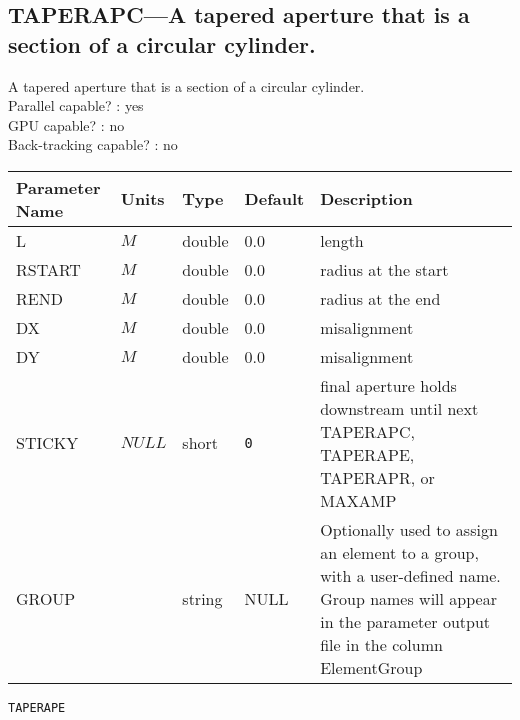 \subsection{TAPERAPC---A tapered aperture that is a section of a circular cylinder.}
A tapered aperture that is a section of a circular cylinder.
\\
Parallel capable? : yes\\
GPU capable? : no\\
Back-tracking capable? : no\\
\begin{tabular}{|l|l|l|l|p{\descwidth}|} \hline
Parameter Name & Units & Type & Default & Description \\ \hline 
L & $M$ & double &  0.0 & length  \\ \hline 
RSTART & $M$ & double &  0.0 & radius at the start  \\ \hline 
REND & $M$ & double &  0.0 & radius at the end  \\ \hline 
DX & $M$ & double &  0.0 & misalignment  \\ \hline 
DY & $M$ & double &  0.0 & misalignment  \\ \hline 
STICKY & $NULL$ & short &  \verb|0| & final aperture holds downstream until next TAPERAPC, TAPERAPE, TAPERAPR, or MAXAMP  \\ \hline 
GROUP &  & string & NULL & Optionally used to assign an element to a group, with a user-defined name.  Group names will appear in the parameter output file in the column ElementGroup  \\ \hline 
\end{tabular}

\newpage
\begin{center}{\Large\verb|TAPERAPE|}\end{center}
